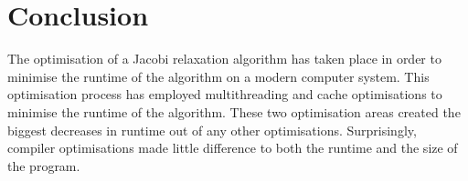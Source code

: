 \documentclass[12pt]{article}
\begin{document}
\section{Conclusion}
The optimisation of a Jacobi relaxation algorithm has taken place in order to minimise the runtime of the algorithm
on a modern computer system. This optimisation process has employed multithreading and cache optimisations to
minimise the runtime of the algorithm. These two optimisation areas created the biggest decreases in runtime out
of any other optimisations. Surprisingly, compiler optimisations made little difference to both the runtime and
the size of the program.

\newpage
\medskip


\end{document}
